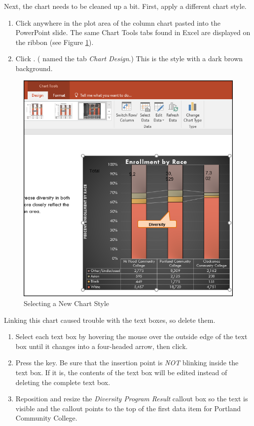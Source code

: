 Next, the chart needs to be cleaned up a bit. First, apply a different chart style.

\begin{enumerate}
	\item Click anywhere in the plot area of the column chart pasted into the PowerPoint slide. The same Chart Tools tabs found in Excel are displayed on the ribbon (see Figure \ref{04:fig50}).
	\item Click . ( named the tab \textit{Chart Design}.) This is the style with a dark brown background.
\end{enumerate}

\begin{figure}[H]
	\centering
	\includegraphics[width=\maxwidth{.85\linewidth}]{gfx/ch04_fig50}
	\caption{Selecting a New Chart Style}
	\label{04:fig50}
\end{figure}

Linking this chart caused trouble with the text boxes, so delete them.

\begin{enumerate}
	\item Select each text box by hovering the mouse over the outside edge of the text box until it changes into a four-headed arrow, then click.
	\item Press the  key. Be sure that the insertion point is \textit{NOT} blinking inside the text box. If it is, the contents of the text box will be edited instead of deleting the complete text box.
	\item Reposition and resize the \textit{Diversity Program Result} callout box so the text is visible and the callout points to the top of the first data item for Portland Community College.
\end{enumerate}

